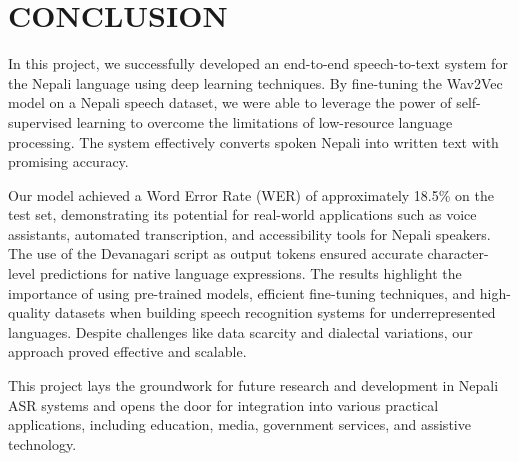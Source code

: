 \chapter{CONCLUSION}
In this project, we successfully developed an end-to-end speech-to-text system for the Nepali language using deep learning techniques. By fine-tuning the Wav2Vec model on a Nepali speech dataset, we were able to leverage the power of self-supervised learning to overcome the limitations of low-resource language processing. The system effectively converts spoken Nepali into written text with promising accuracy. 
\par
Our model achieved a Word Error Rate (WER) of approximately 18.5\% on the test set, demonstrating its potential for real-world applications such as voice assistants, automated transcription, and accessibility tools for Nepali speakers. The use of the Devanagari script as output tokens ensured accurate character-level predictions for native language expressions.
The results highlight the importance of using pre-trained models, efficient fine-tuning techniques, and high-quality datasets when building speech recognition systems for underrepresented languages. Despite challenges like data scarcity and dialectal variations, our approach proved effective and scalable.
\par
This project lays the groundwork for future research and development in Nepali ASR systems and opens the door for integration into various practical applications, including education, media, government services, and assistive technology.
